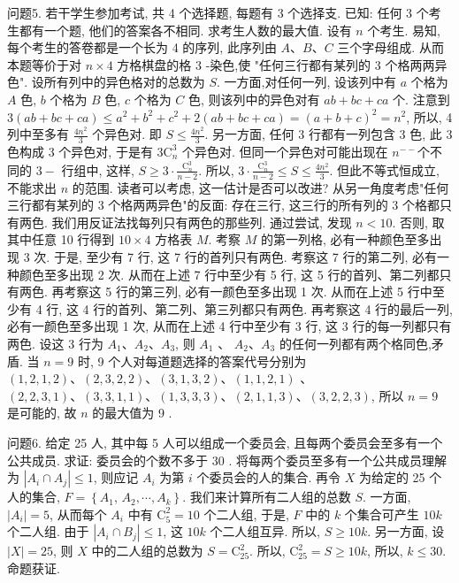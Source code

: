 问题5. 若干学生参加考试, 共 4 个选择题, 每题有 3 个选择支.
已知: 任何 3 个考生都有一个题, 他们的答案各不相同.
求考生人数的最大值.
设有 $n$ 个考生.
易知, 每个考生的答卷都是一个长为 4 的序列, 此序列由 $A 、 B 、 C$ 三个字母组成.
从而本题等价于对 $n \times 4$ 方格棋盘的格 3 -染色,使 "任何三行都有某列的 3 个格两两异色". 设所有列中的异色格对的总数为 $S$. 一方面,对任何一列, 设该列中有 $a$ 个格为 $A$ 色, $b$ 个格为 $B$ 色, $c$ 个格为 $C$ 色, 则该列中的异色对有 $a b+b c+c a$ 个.
注意到 $3(a b+b c+c a) \leqslant a^2+b^2+c^2+2(a b+b c+c a)=(a+b+c)^2=n^2$, 所以, 4 列中至多有 $\frac{4 n^2}{3}$ 个异色对.
即 $S \leqslant \frac{4 n^2}{3}$. 另一方面, 任何 3 行都有一列包含 3 色, 此 3 色构成 3 个异色对, 于是有 $3 \mathrm{C}_n^3$ 个异色对.
但同一个异色对可能出现在 $n^{--}$个不同的 $3-$ 行组中, 这样, $S \geqslant 3 \cdot \frac{\mathrm{C}_n^3}{n-2}$. 所以, $3 \cdot \frac{\mathrm{C}_n^3}{n-2} \leqslant S \leqslant \frac{4 n^2}{3}$. 但此不等式恒成立, 不能求出 $n$ 的范围.
读者可以考虑, 这一估计是否可以改进? 从另一角度考虑"任何三行都有某列的 3 个格两两异色"的反面: 存在三行, 这三行的所有列的 3 个格都只有两色.
我们用反证法找每列只有两色的那些列.
通过尝试, 发现 $n<10$. 否则, 取其中任意 10 行得到 $10 \times 4$ 方格表 $M$. 考察 $M$ 的第一列格, 必有一种颜色至多出现 3 次.
于是, 至少有 7 行, 这 7 行的首列只有两色.
考察这 7 行的第二列, 必有一种颜色至多出现 2 次.
从而在上述 7 行中至少有 5 行, 这 5 行的首列、第二列都只有两色.
再考察这 5 行的第三列, 必有一颜色至多出现 1 次.
从而在上述 5 行中至少有 4 行, 这 4 行的首列、第二列、第三列都只有两色.
再考察这 4 行的最后一列, 必有一颜色至多出现 1 次, 从而在上述 4 行中至少有 3 行, 这 3 行的每一列都只有两色.
设这 3 行为 $A_1 、 A_2 、 A_3$, 则 $A_1$ 、 $A_2 、 A_3$ 的任何一列都有两个格同色,矛盾.
当 $n=9$ 时, 9 个人对每道题选择的答案代号分别为 $(1,2,1,2) 、(2,3,2,2) 、(3,1,3,2) 、(1,1,2,1)$ 、 $(2,2,3,1) 、(3,3,1,1) 、(1,3,3,3) 、(2,1,1,3) 、(3,2,2,3)$, 所以 $n=9$ 是可能的, 故 $n$ 的最大值为 9 .



问题6. 给定 25 人, 其中每 5 人可以组成一个委员会, 且每两个委员会至多有一个公共成员.
求证: 委员会的个数不多于 30 . 
将每两个委员至多有一个公共成员理解为 $\left|A_i \cap A_j\right| \leqslant 1$, 则应记 $A_i$ 为第 $i$ 个委员会的人的集合.
再令 $X$ 为给定的 25 个人的集合, $F=\left\{A_1\right.$, $\left.A_2, \cdots, A_k\right\}$. 我们来计算所有二人组的总数 $S$. 一方面, $\left|A_i\right|=5$, 从而每个 $A_i$ 中有 $\mathrm{C}_5^2=10$ 个二人组, 于是, $F$ 中的 $k$ 个集合可产生 $10 k$ 个二人组.
由于 $\left|A_i \cap B_j\right| \leqslant 1$, 这 $10 k$ 个二人组互异.
所以, $S \geqslant 10 k$. 另一方面, 设 $|X|=25$, 则 $X$ 中的二人组的总数为 $S=\mathrm{C}_{25}^2$. 所以, $\mathrm{C}_{25}^2=S \geqslant 10 k$, 所以, $k \leqslant 30$. 命题获证.


